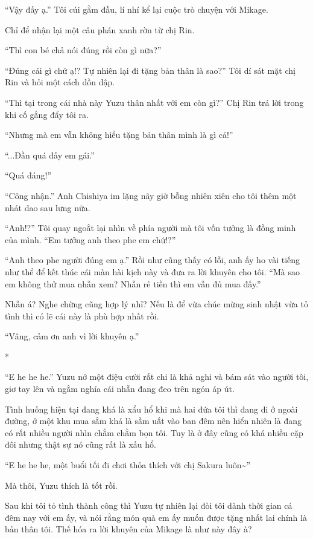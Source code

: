{``Vậy đấy ạ.'' Tôi cúi gằm đầu, lí nhí kể lại cuộc trò chuyện với
Mikage.

Chỉ để nhận lại một câu phán xanh rờn từ chị Rin.

``Thì con bé chả nói đúng rồi còn gì nữa?''

``Đúng cái gì chứ ạ!? Tự nhiên lại đi tặng bản thân là sao?'' Tôi dí sát
mặt chị Rin và hỏi một cách dồn dập.

``Thì tại trong cái nhà này Yuzu thân nhất với em còn gì?'' Chị Rin trả
lời trong khi cố gắng đẩy tôi ra.

``Nhưng mà em vẫn không hiểu tặng bản thân mình là gì cả!''

``...Đần quá đấy em gái.''

``Quá đáng!''

``Công nhận.'' Anh Chishiya im lặng nãy giờ bỗng nhiên xiên cho tôi thêm
một nhát dao sau lưng nữa.

``Anh!?'' Tôi quay ngoắt lại nhìn về phía người mà tôi vốn tưởng là đồng
minh của mình. ``Em tưởng anh theo phe em chứ!?''

``Anh theo phe người đúng em ạ.'' Rồi như cũng thấy có lỗi, anh ấy ho
vài tiếng như thể để kết thúc cái màn hài kịch này và đưa ra lời khuyên
cho tôi. ``Mà sao em không thử mua nhẫn xem? Nhẫn rẻ tiền thì em vẫn đủ
mua đấy.''

Nhẫn á? Nghe chừng cũng hợp lý nhỉ? Nếu là để vừa chúc mừng sinh nhật
vừa tỏ tình thì có lẽ cái này là phù hợp nhất rồi.

``Vâng, cảm ơn anh vì lời khuyên ạ.''

*

``E he he he.'' Yuzu nở một điệu cười rất chi là khả nghi và bám sát vào
người tôi, giơ tay lên và ngắm nghía cái nhẫn đang đeo trên ngón áp út.

Tình huống hiện tại đang khá là xẩu hổ khi mà hai đứa tôi thì đang đi ở
ngoài đường, ở một khu mua sắm khá là sầm uất vào ban đêm nên hiển nhiên
là đang có rất nhiều người nhìn chằm chằm bọn tôi. Tuy là ở đây cũng có
khá nhiều cặp đôi nhưng thật sự nó cũng rất là xấu hổ.

``E he he he, một buổi tối đi chơi thỏa thích với chị Sakura
luôn\textasciitilde''

Mà thôi, Yuzu thích là tốt rồi.

Sau khi tôi tỏ tình thành công thì Yuzu tự nhiên lại đòi tôi dành thời
gian cả đêm nay với em ấy, và nói rằng món quà em ấy muốn được tặng nhất
lai chính là bản thân tôi. Thế hóa ra lời khuyên của Mikage là như này
đây à?

}
